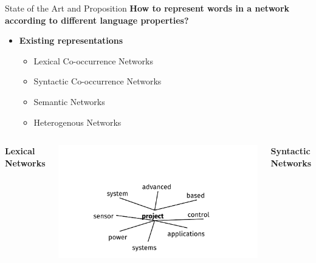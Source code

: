 \documentclass[10pt,xcolor=table]{beamer}
\begin{document}
\begin{frame}{State of the Art and Proposition}
	\large \textbf{How to represent words in a network according to different language properties?}


\begin{itemize}
	\item \textbf{Existing representations} 
	\begin{itemize}
		\item {Lexical Co-occurrence Networks} \cite{2011.DiMarco.Navigli.ClusteringWebSearch,2011.Jurgens.WSICommunityDetection,2014.Tao.Qian.LexicalChainHypergraphWSI}
		\item {Syntactic Co-occurrence Networks} \cite{2013.Bronselaer.TextAnalysisWithGraphs}
		\item Semantic Networks \cite{2010.Siberer.GraphCooccurrenceWSD,2014.Moro.Navigli.EntityLinking_WSD}
		\item Heterogenous Networks	\cite{2013.Saluja.Graph-BasedUnsupervisedLearning}	
	\end{itemize}
\end{itemize}
\begin{columns}
\textbf{\normalsize Lexical Networks}
\begin{minipage}[c][0.3\textheight][c]{\linewidth}
\includegraphics[width=1\linewidth]{image2/Chapitre2/lex_net1.pdf}
\end{minipage}
\textbf{\normalsize Syntactic Networks} 
\begin{minipage}[c][0.3\textheight][c]{\linewidth}

\end{minipage}
\end{columns}
\end{frame}
\end{document}
